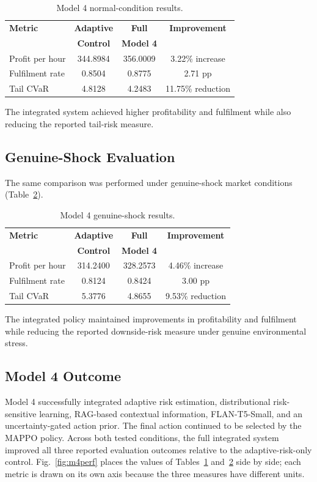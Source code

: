 \documentclass[conference]{IEEEtran}
\begin{document}
\begin{table}[!t]
\centering
\caption{Model 4 normal-condition results.}
\label{tab:m4normal}
\small
\setlength{\tabcolsep}{4pt}
\begin{tabular}{lccc}
\toprule
\textbf{Metric} & \textbf{Adaptive} & \textbf{Full} & \textbf{Improvement} \\
 & \textbf{Control} & \textbf{Model 4} & \\
\midrule
Profit per hour & 344.8984 & 356.0009 & 3.22\% increase \\
Fulfilment rate & 0.8504   & 0.8775   & 2.71 pp \\
Tail CVaR       & 4.8128   & 4.2483   & 11.75\% reduction \\
\bottomrule
\end{tabular}
\end{table}

The integrated system achieved higher profitability and fulfilment while also reducing the reported tail-risk measure.

\subsection{Genuine-Shock Evaluation}
The same comparison was performed under genuine-shock market conditions (Table~\ref{tab:m4shock}).

\begin{table}[!t]
\centering
\caption{Model 4 genuine-shock results.}
\label{tab:m4shock}
\small
\setlength{\tabcolsep}{4pt}
\begin{tabular}{lccc}
\toprule
\textbf{Metric} & \textbf{Adaptive} & \textbf{Full} & \textbf{Improvement} \\
 & \textbf{Control} & \textbf{Model 4} & \\
\midrule
Profit per hour & 314.2400 & 328.2573 & 4.46\% increase \\
Fulfilment rate & 0.8124   & 0.8424   & 3.00 pp \\
Tail CVaR       & 5.3776   & 4.8655   & 9.53\% reduction \\
\bottomrule
\end{tabular}
\end{table}

The integrated policy maintained improvements in profitability and fulfilment while reducing the reported downside-risk measure under genuine environmental stress.

\subsection{Model 4 Outcome}
Model 4 successfully integrated adaptive risk estimation, distributional risk-sensitive learning, RAG-based contextual information, FLAN-T5-Small, and an uncertainty-gated action prior. The final action continued to be selected by the MAPPO policy. Across both tested conditions, the full integrated system improved all three reported evaluation outcomes relative to the adaptive-risk-only control. Fig.~\ref{fig:m4perf} places the values of Tables~\ref{tab:m4normal} and~\ref{tab:m4shock} side by side; each metric is drawn on its own axis because the three measures have different units.
\end{document}
